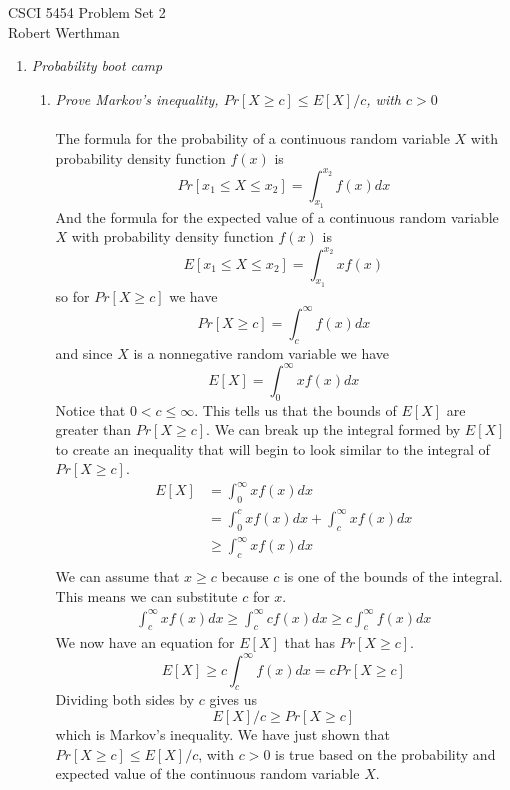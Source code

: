 \documentclass[12pt]{article}
\begin{document}
CSCI 5454 \hfill Problem Set 2\\
Robert Werthman

\hrulefill

\begin{enumerate}

	\item \textit{Probability boot camp}
	
	\begin{enumerate}
	
		\item \textit{Prove Markov's inequality, $Pr[X \ge c] \le E[X]/c$, with $c>0$}\\
		\\
		The formula for the probability of a continuous random variable $X$ with probability density function $f(x)$ is
			$$
			Pr[x_1 \le X \le x_2] = \int_{x_1}^{x_2} f(x)dx
			$$	
		And the formula for the expected value of a continuous random variable $X$ with probability density function $f(x)$ is
			$$
			E[x_1 \le X \le x_2] = \int_{x_1}^{x_2} xf(x)
			$$	
		so for $Pr[X \ge c]$ we have
			$$
			Pr[X \ge c] = \int_{c}^{\infty} f(x)dx
			$$
		and since $X$ is a nonnegative random variable we have
			$$
			E[X] = \int_{0}^{\infty} xf(x)dx
			$$
		Notice that $0 < c \le \infty$.  This tells us that the bounds of $E[X]$ are greater than $Pr[X \ge c]$.  We can break up the integral formed by $E[X]$ to create an inequality that 
		will begin to look similar to the integral of $Pr[X \ge c]$.
			\begin{align*}
				E[X] &= \int_{0}^{\infty} xf(x)dx\\
				&= \int_{0}^{c} xf(x)dx + \int_{c}^{\infty} xf(x)dx\\
				&\ge \int_{c}^{\infty} xf(x)dx\\
			\end{align*}
		We can assume that $x \ge c$ because $c$ is one of the bounds of the integral.  This means we can substitute $c$ for $x$.
			\begin{align*}
				 \int_{c}^{\infty} xf(x)dx \ge \int_{c}^{\infty} cf(x)dx \ge c\int_{c}^{\infty} f(x)dx
			\end{align*}
		We now have an equation for $E[X]$ that has $Pr[X \ge c]$.
			$$
			E[X] \ge c\int_{c}^{\infty} f(x)dx = cPr[X \ge c]
			$$
		Dividing both sides by $c$ gives us
			$$
			E[X]/c \ge Pr[X \ge c]
			$$
		which is Markov's inequality.  We have just shown that $Pr[X \ge c] \le E[X]/c$, with $c>0$ is true based on the probability and expected value of the continuous random variable $X$.
		

\end{enumerate}
\end{enumerate}
\end{document}
